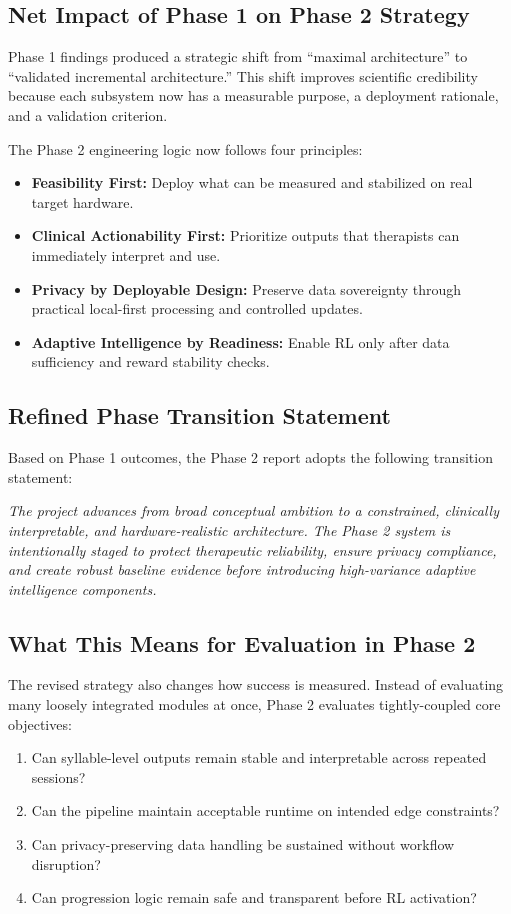 \documentclass[12pt,a4paper]{article}
\begin{document}
\newpage
\subsection{Net Impact of Phase 1 on Phase 2 Strategy}
Phase 1 findings produced a strategic shift from ``maximal architecture'' to ``validated incremental architecture.'' This shift improves scientific credibility because each subsystem now has a measurable purpose, a deployment rationale, and a validation criterion.

The Phase 2 engineering logic now follows four principles:
\begin{itemize}[noitemsep,topsep=2pt]
\item \textbf{Feasibility First:} Deploy what can be measured and stabilized on real target hardware.
\item \textbf{Clinical Actionability First:} Prioritize outputs that therapists can immediately interpret and use.
\item \textbf{Privacy by Deployable Design:} Preserve data sovereignty through practical local-first processing and controlled updates.
\item \textbf{Adaptive Intelligence by Readiness:} Enable RL only after data sufficiency and reward stability checks.
\end{itemize}

\subsection{Refined Phase Transition Statement}
Based on Phase 1 outcomes, the Phase 2 report adopts the following transition statement:

\textit{The project advances from broad conceptual ambition to a constrained, clinically interpretable, and hardware-realistic architecture. The Phase 2 system is intentionally staged to protect therapeutic reliability, ensure privacy compliance, and create robust baseline evidence before introducing high-variance adaptive intelligence components.}

\subsection{What This Means for Evaluation in Phase 2}
The revised strategy also changes how success is measured. Instead of evaluating many loosely integrated modules at once, Phase 2 evaluates tightly-coupled core objectives:
\begin{enumerate}[noitemsep,topsep=2pt]
\item Can syllable-level outputs remain stable and interpretable across repeated sessions?
\item Can the pipeline maintain acceptable runtime on intended edge constraints?
\item Can privacy-preserving data handling be sustained without workflow disruption?
\item Can progression logic remain safe and transparent before RL activation?
\end{enumerate}
\end{document}

